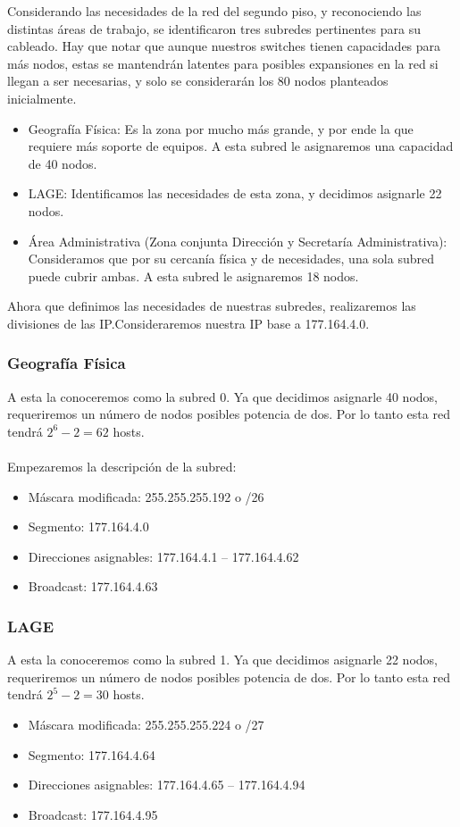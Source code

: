 \documentclass[../main.tex]{subfiles}
\begin{document}
Considerando las necesidades de la red del segundo piso, y reconociendo las distintas áreas de trabajo, se identificaron tres subredes pertinentes para su cableado. Hay que notar que aunque nuestros switches tienen capacidades para más nodos, estas se mantendrán latentes para posibles expansiones en la red si llegan a ser necesarias, y solo se considerarán los 80 nodos planteados inicialmente.
\begin{itemize}
\item Geografía Física:
  Es la zona por mucho más grande, y por ende la que requiere más soporte de equipos. A esta subred le asignaremos una capacidad de 40 nodos.
\item LAGE:\@
  Identificamos las necesidades de esta zona, y decidimos asignarle 22 nodos.
\item Área Administrativa (Zona conjunta Dirección y Secretaría Administrativa):
  Consideramos que por su cercanía física y de necesidades, una sola subred puede cubrir ambas. A esta subred le asignaremos 18 nodos.
\end{itemize}

Ahora que definimos las necesidades de nuestras subredes, realizaremos las divisiones de las IP.\@ Consideraremos nuestra IP base a 177.164.4.0.

\subsubsection*{Geografía Física}
A esta la conoceremos como la subred 0. Ya que decidimos asignarle 40 nodos, requeriremos un número de nodos posibles potencia de dos. Por lo tanto esta red tendrá $2^6 - 2 = 62$ hosts. 
\\\\
Empezaremos la descripción de la subred:
\begin{itemize}
\item Máscara modificada: 255.255.255.192 o /26
\item Segmento: 177.164.4.0
\item Direcciones asignables: 177.164.4.1 -- 177.164.4.62
\item Broadcast: 177.164.4.63
\end{itemize}
\subsubsection*{LAGE}
A esta la conoceremos como la subred 1. Ya que decidimos asignarle 22 nodos, requeriremos un número de nodos posibles potencia de dos. Por lo tanto esta red tendrá $2^5 - 2 = 30$ hosts. 
\begin{itemize}
\item Máscara modificada: 255.255.255.224 o /27
\item Segmento: 177.164.4.64
\item Direcciones asignables: 177.164.4.65 -- 177.164.4.94
\item Broadcast: 177.164.4.95
\end{itemize}
\end{document}
